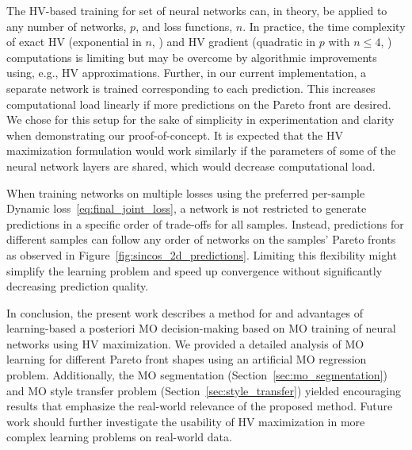 The HV-based training for set of neural networks can, in theory, be applied to any number of networks, $p$, and loss functions, $n$. In practice, the time complexity of exact HV (exponential in $n$, \cite{fonseca2006improved}) and HV gradient (quadratic in $p$ with $n\leq 4$, \cite{emmerich2014time}) computations is limiting but may be overcome by algorithmic improvements using, e.g., HV approximations. Further, in our current implementation, a separate network is trained corresponding to each prediction. This increases computational load linearly if more predictions on the Pareto front are desired. We chose for this setup for the sake of simplicity in experimentation and clarity when demonstrating our proof-of-concept. It is expected that the HV maximization formulation would work similarly if the parameters of some of the neural network layers are shared, which would decrease computational load.

When training networks on multiple losses using the preferred per-sample Dynamic loss~\eqref{eq:final_joint_loss}, a network is not restricted to generate predictions in a specific order of trade-offs for all samples. Instead, predictions for different samples can follow any order of networks on the samples' Pareto fronts as observed in Figure~\ref{fig:sincos_2d_predictions}. Limiting this flexibility might simplify the learning problem and speed up convergence without significantly decreasing prediction quality.

In conclusion, the present work describes a method for and advantages of learning-based a posteriori MO decision-making based on MO training of neural networks using HV maximization. We provided a detailed analysis of MO learning for different Pareto front shapes using an artificial MO regression problem. Additionally, the MO segmentation (Section~\ref{sec:mo_segmentation}) and MO style transfer problem (Section~\ref{sec:style_transfer}) yielded encouraging results that emphasize the real-world relevance of the proposed method. Future work should further investigate the usability of HV maximization in more complex learning problems on real-world data. 


\newpage

\vskip 0.2in

\newpage

